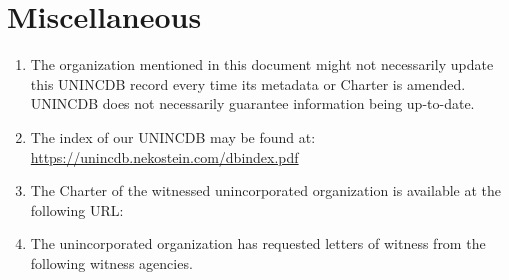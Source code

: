 \section{Miscellaneous}
\begin{enumerate}
    \tightlist
    \item The organization mentioned in this document might not necessarily update this UNINCDB record
        every time its metadata or Charter is amended.
        UNINCDB does not necessarily guarantee information being up-to-date.
    \item The index of our UNINCDB may be found at:\\
        \href{https://unincdb.nekostein.com/dbindex.pdf}{https://unincdb.nekostein.com/dbindex.pdf}
    \item The Charter of the witnessed unincorporated organization is available at the following URL:\\
        
    \item The unincorporated organization has requested letters of witness from the following witness agencies.
    \begin{itemize}
        
    \end{itemize}
\end{enumerate}

\hsepline








